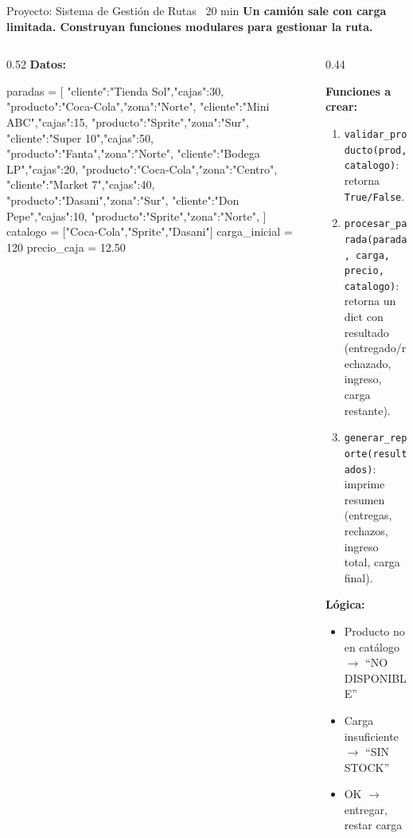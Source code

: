 \documentclass[aspectratio=169, 11pt]{beamer}
\begin{document}
\begin{frame}[fragile,shrink=30]{Proyecto: Sistema de Gestión de Rutas \hfill
    {\normalsize\color{arcaRed}\faClock\ 20 min}}
  \vspace{-6pt}
  {\small\color{arcaDark}\bfseries
    Un camión sale con carga limitada.
    Construyan funciones modulares para gestionar la ruta.}

  \vspace{3pt}
  \begin{columns}[T]
    \begin{column}{0.52\textwidth}
      {\footnotesize\color{arcaDark}\bfseries Datos:}
      \vspace{2pt}
      \begin{pyblock}
paradas = [
  {"cliente":"Tienda Sol","cajas":30,
   "producto":"Coca-Cola","zona":"Norte"},
  {"cliente":"Mini ABC","cajas":15,
   "producto":"Sprite","zona":"Sur"},
  {"cliente":"Super 10","cajas":50,
   "producto":"Fanta","zona":"Norte"},
  {"cliente":"Bodega LP","cajas":20,
   "producto":"Coca-Cola","zona":"Centro"},
  {"cliente":"Market 7","cajas":40,
   "producto":"Dasani","zona":"Sur"},
  {"cliente":"Don Pepe","cajas":10,
   "producto":"Sprite","zona":"Norte"},
]
catalogo = ["Coca-Cola","Sprite","Dasani"]
carga_inicial = 120
precio_caja = 12.50
      \end{pyblock}
    \end{column}

    \begin{column}{0.44\textwidth}
      {\footnotesize\color{textMuted}
        \textbf{Funciones a crear:}
        \begin{enumerate}\setlength{\itemsep}{3pt}
          \item \texttt{validar\_producto(prod, catalogo)}:
            retorna \texttt{True/False}.
          \item \texttt{procesar\_parada(parada, carga,}
            \texttt{precio, catalogo)}:
            retorna un dict con resultado
            (entregado/rechazado, ingreso,
            carga restante).
          \item \texttt{generar\_reporte(resultados)}:
            imprime resumen (entregas, rechazos,
            ingreso total, carga final).
        \end{enumerate}

        \vspace{4pt}
        \textbf{Lógica:}
        \begin{itemize}\setlength{\itemsep}{1pt}
          \item Producto no en catálogo $\rightarrow$
            ``NO DISPONIBLE''
          \item Carga insuficiente $\rightarrow$
            ``SIN STOCK''
          \item OK $\rightarrow$ entregar, restar carga
        \end{itemize}
      }
    \end{column}
  \end{columns}
\end{frame}
\end{document}
